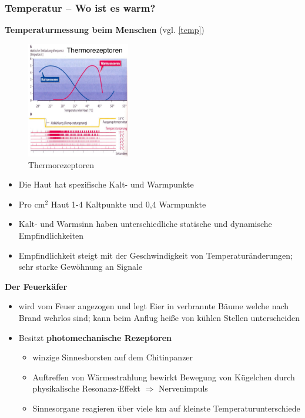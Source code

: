 \subsubsection{Temperatur – Wo ist es warm?}
\textbf{Temperaturmessung beim Menschen} (vgl. \autoref{temp})
\begin{figure}[h!]
	\centering
	\includegraphics[width=0.4\textwidth]{figures/ch04_temp.png}
	\caption{Thermorezeptoren}
	\label{temp}
\end{figure}
\begin{itemize}
\setlength\itemsep{0em}
\item Die Haut hat spezifische Kalt- und Warmpunkte
\item Pro $\text{cm}^2$ Haut 1-4 Kaltpunkte und 0,4 Warmpunkte
\item Kalt- und Warmsinn haben unterschiedliche statische und dynamische Empfindlichkeiten
\item Empfindlichkeit steigt mit der Geschwindigkeit von Temperaturänderungen; sehr starke Gewöhnung an Signale
\end{itemize}
\noindent
\textbf{Der Feuerkäfer}
\begin{itemize}
\setlength\itemsep{0em}
\item wird vom Feuer angezogen und legt Eier in verbrannte Bäume welche nach Brand \glqq wehrlos\grqq{} sind; kann beim Anflug heiße von kühlen Stellen unterscheiden
\item Besitzt \textbf{photomechanische Rezeptoren}
\begin{itemize}
\item winzige Sinnesborsten auf dem Chitinpanzer
\item Auftreffen von Wärmestrahlung bewirkt Bewegung von Kügelchen durch physikalische Resonanz-Effekt $\Rightarrow$ Nervenimpuls
\item Sinnesorgane reagieren über viele km auf kleinste Temperaturunterschiede
\end{itemize}
\end{itemize}

